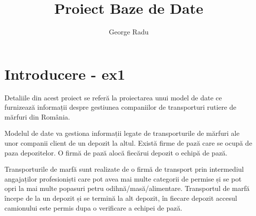 \documentclass[12pt, a4paper]{article}
\title{Proiect Baze de Date}
\author{George Radu}
\date{}
\begin{document}
\maketitle

\section{Introducere - ex1}
\quad \par
Detaliile din acest proiect se referă la proiectarea unui model de date ce furnizează informații despre gestiunea companiilor de transporturi rutiere de mărfuri din România.

Modelul de date va gestiona informații legate de transporturile de mărfuri ale unor companii client de un depozit la altul. Există firme de pază care se ocupă de paza depozitelor. O firmă de pază alocă fiecărui depozit o echipă de pază.

Transporturile de marfă sunt realizate de o firmă de transport prin intermediul angajaților profesioniști care pot avea mai multe categorii de permise și se pot opri la mai multe popasuri petru odihnă/masă/alimentare. Transportul de marfă începe de la un depozit și se termină la alt depozit, în fiecare depozit accesul camionului este permis dupa o verificare a echipei de pază.
\end{document}
